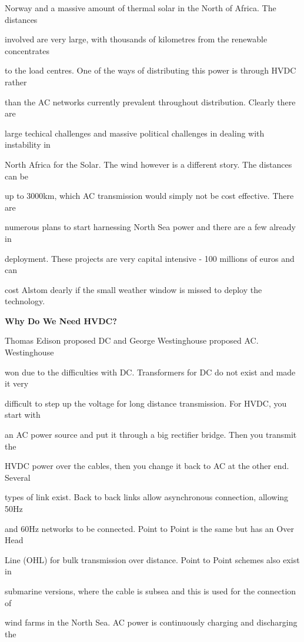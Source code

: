 Norway and a massive amount of thermal solar in the North of Africa. The distances 

involved are very large, with thousands of kilometres from the renewable concentrates 

to the load centres. One of the ways of distributing this power is through HVDC rather 

than the AC networks currently prevalent throughout distribution. Clearly there are 

large techical challenges and massive political challenges in dealing with instability in 

North Africa for the Solar. The wind however is a different story. The distances can be 

up to 3000km, which AC transmission would simply not be cost effective. There are 

numerous plans to start harnessing North Sea power and there are a few already in 

deployment. These projects are very capital intensive - 100 millions of euros and can 

cost Alstom dearly if the small weather window is missed to deploy the technology.

\textbf{Why Do We Need HVDC?}

Thomas Edison proposed DC and George Westinghouse proposed AC. Westinghouse 

won due to the difficulties with DC. Transformers for DC do not exist and made it very 

difficult to step up the voltage for long distance transmission. For HVDC, you start with 

an AC power source and put it through a big rectifier bridge. Then you transmit the 

HVDC power over the cables, then you change it back to AC at the other end. Several 

types of link exist. Back to back links allow asynchronous connection, allowing 50Hz 

and 60Hz networks to be connected. Point to Point is the same but has an Over Head 

Line (OHL) for bulk transmission over distance. Point to Point schemes also exist in 

submarine versions, where the cable is subsea and this is used for the connection of 

wind farms in the North Sea. AC power is continuously charging and discharging the 

